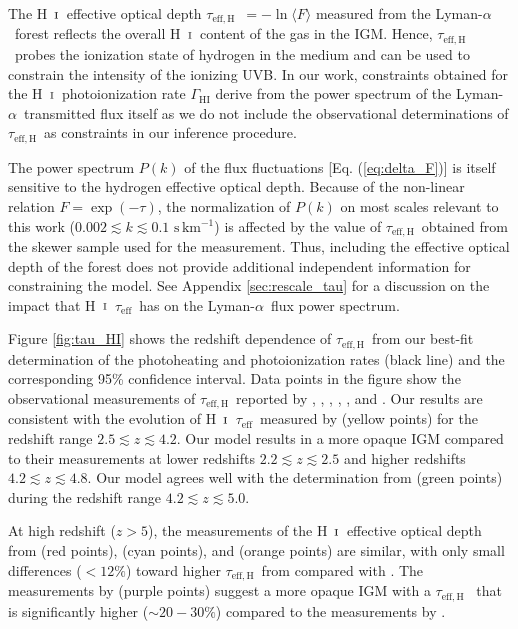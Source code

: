 \documentclass[twocolumn]{aastex62}
\newcommand\Lya{Lyman-$\alpha$}
\def\HI{\hbox{\rm H~$\scriptstyle\rm I$}}
\newcommand\taueff{$\tau_{\mathrm{eff}}$~}
\newcommand\taueffH{$\tau_{\mathrm{eff,H}}$~}
\begin{document}
The \HI\ effective optical depth \taueffH$=-\ln \langle F \rangle$ measured from the \Lya\ forest reflects the overall \HI\ content of the gas in the IGM. Hence, \taueffH probes the ionization 
state of hydrogen in the medium and can be used to constrain the intensity of the ionizing UVB.   
In our work, constraints obtained for the \HI\ photoionization rate $\Gamma_{\mathrm{HI}}$
derive from the power spectrum of the \Lya\ transmitted flux itself as we do not include 
the observational determinations of \taueffH as constraints in our inference procedure.

The power spectrum $P(k)$ of the flux fluctuations [Eq. (\ref{eq:delta_F})] is itself sensitive to the 
hydrogen effective optical depth.  Because of the non-linear relation $F = \exp(-\tau)$, 
the normalization of $P(k)$ on most scales relevant to this work ($0.002 \lesssim k \lesssim 0.1 \,\, \mathrm{s\, km^{-1}}$) is 
affected by the value of \taueffH obtained from the skewer sample used for the measurement. 
Thus, including the
effective optical depth of the forest does not provide additional independent information for constraining the model.
See Appendix \ref{sec:rescale_tau} for a discussion on the impact 
that \HI\ \taueff has on the \Lya\ flux power spectrum.     


Figure \ref{fig:tau_HI} shows the redshift dependence of \taueffH from our best-fit determination
of the photoheating and photoionization rates (black line) and the
corresponding  95\% confidence interval.
Data points in the figure show the observational measurements of \taueffH reported by
\cite{Fan+2006}, \cite{Becker+2013a}, 
\cite{Bosman_2018}, \cite{eilers2018a}, \cite{boera2019a}, and \cite{Yang+2020b}.
Our results are consistent with the evolution of \HI\ \taueff measured by \cite{Becker+2013a} (yellow points) for the redshift range 
$2.5 \lesssim z \lesssim 4.2$.
Our model results in a more opaque IGM compared to their measurements at lower redshifts  $2.2 \lesssim z \lesssim 2.5$ and
higher redshifts
$ 4.2 \lesssim z \lesssim 4.8$.
Our model agrees well with the determination from \cite{boera2019a} (green points) during 
the redshift range $4.2 \lesssim z \lesssim 5.0$.
 
At high redshift ($z>5$), the measurements of the \HI\ effective optical depth from 
\cite{Bosman_2018} (red points), \cite{eilers2018a} (cyan points), and \cite{Fan+2006} (orange points)
are similar, with only small differences ($<12\%$) toward
higher \taueffH from \cite{eilers2018a} compared with \cite{Bosman_2018}.
The measurements by 
\cite{Yang+2020b} (purple points) suggest a more opaque IGM with a \taueffH
that is significantly higher ($\sim 20 - 30 \%$) compared to the measurements by \cite{Bosman_2018}. 
\end{document}
